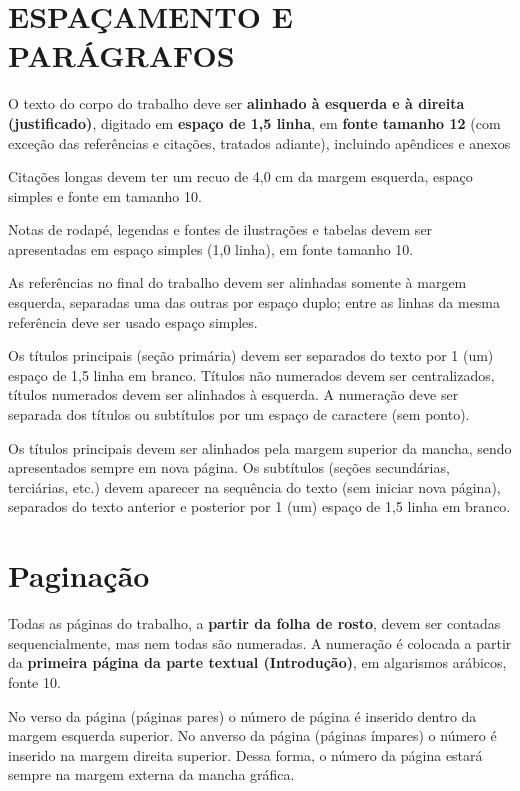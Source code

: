 \section{ESPAÇAMENTO E PARÁGRAFOS}

O texto do corpo do trabalho deve ser \textbf{alinhado à esquerda e à direita (justificado)}, digitado
em \textbf{espaço de 1,5 linha}, em \textbf{fonte tamanho 12 }(com exceção das referências e citações, tratados adiante), incluindo apêndices e anexos

Citações longas devem ter um recuo de 4,0 cm da margem esquerda, espaço simples e fonte
em tamanho 10.

Notas de rodapé, legendas e fontes de ilustrações e tabelas devem ser apresentadas em
espaço simples (1,0 linha), em fonte tamanho 10.

As referências no final do trabalho devem ser alinhadas somente à margem esquerda,
separadas uma das outras por espaço duplo; entre as linhas da mesma referência deve ser usado
espaço simples.

Os títulos principais (seção primária) devem ser separados do texto por 1 (um) espaço de 1,5
linha em branco. Títulos não numerados devem ser centralizados, títulos numerados devem ser
alinhados à esquerda. A numeração deve ser separada dos títulos ou subtítulos por um espaço de
caractere (sem ponto).

Os títulos principais devem ser alinhados pela margem superior da mancha, sendo
apresentados sempre em nova página. Os subtítulos (seções secundárias, terciárias, etc.) devem
aparecer na sequência do texto (sem iniciar nova página), separados do texto anterior e posterior
por 1 (um) espaço de 1,5 linha em branco.

\section{Paginação}

Todas as páginas do trabalho, a \textbf{partir da folha de rosto}, devem ser contadas sequencialmente,
mas nem todas são numeradas. A numeração é colocada a partir da \textbf{primeira página da parte textual (Introdução)}, em algarismos arábicos, fonte 10.

No verso da página (páginas pares) o número de página é inserido dentro da margem
esquerda superior. No anverso da página (páginas ímpares) o número é inserido na margem direita
superior. Dessa forma, o número da página estará sempre na margem externa da mancha gráfica.

